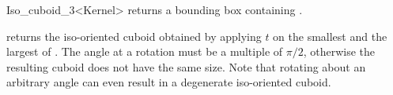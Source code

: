 \begin{ccRefClass} {Iso_cuboid_3<Kernel>}
       {returns a bounding box containing \ccVar. }

       {returns the iso-oriented cuboid obtained by applying $t$ on 
        the smallest and the largest of \ccVar.
        \ccPrecond The angle at a rotation must be a multiple of $\pi/2$,
        otherwise the resulting cuboid does not have the same size.
        Note that rotating about an arbitrary angle can even result in
        a degenerate iso-oriented cuboid.}


\ccSeeAlso
{} \\

\end{ccRefClass} 
